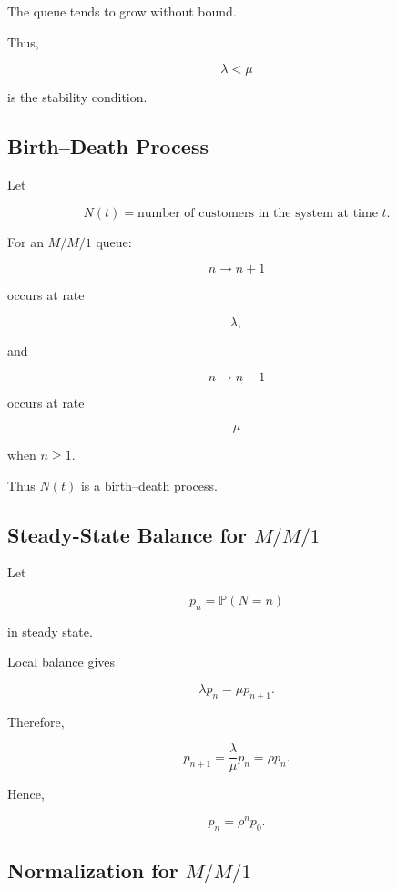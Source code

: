 The queue tends to grow without bound.

Thus,

\[
\boxed{
\lambda<\mu
}
\]

is the stability condition.

\subsection{Birth--Death Process}
\label{subsec:birth-death-queue}

Let

\[
N(t)
=
\text{number of customers in the system at time }t.
\]

For an \(M/M/1\) queue:

\[
n
\to
n+1
\]

occurs at rate

\[
\boxed{
\lambda,
}
\]

and

\[
n
\to
n-1
\]

occurs at rate

\[
\boxed{
\mu
}
\]

when \(n\geq1\).

Thus \(N(t)\) is a birth--death process.

\subsection{Steady-State Balance for \(M/M/1\)}
\label{subsec:mm1-balance}

Let

\[
p_n
=
\mathbb{P}(N=n)
\]

in steady state.

Local balance gives

\[
\boxed{
\lambda p_n
=
\mu p_{n+1}.
}
\]

Therefore,

\[
p_{n+1}
=
\frac{\lambda}{\mu}
p_n
=
\rho p_n.
\]

Hence,

\[
\boxed{
p_n
=
\rho^n p_0.
}
\]

\subsection{Normalization for \(M/M/1\)}
\label{subsec:mm1-normalization}

